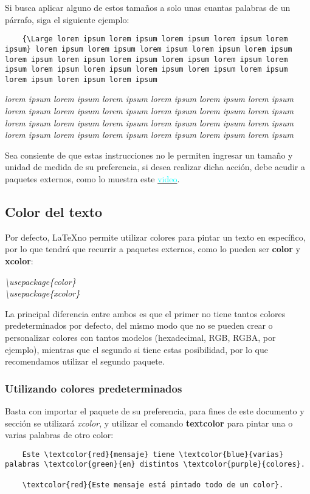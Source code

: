 Si busca aplicar alguno de estos tamaños a solo unas cuantas palabras de un párrafo, siga el siguiente ejemplo:
\begin{lstlisting}
    {\Large lorem ipsum lorem ipsum lorem ipsum lorem ipsum lorem ipsum} lorem ipsum lorem ipsum lorem ipsum lorem ipsum lorem ipsum lorem ipsum lorem ipsum lorem ipsum lorem ipsum lorem ipsum lorem ipsum lorem ipsum lorem ipsum lorem ipsum lorem ipsum lorem ipsum lorem ipsum lorem ipsum lorem ipsum 
\end{lstlisting}

\textit{{\Large lorem ipsum lorem ipsum lorem ipsum lorem ipsum lorem ipsum} lorem ipsum lorem ipsum lorem ipsum lorem ipsum lorem ipsum lorem ipsum lorem ipsum lorem ipsum lorem ipsum lorem ipsum lorem ipsum lorem ipsum lorem ipsum lorem ipsum lorem ipsum lorem ipsum lorem ipsum lorem ipsum lorem ipsum}

Sea consiente de que estas instrucciones no le permiten ingresar un tamaño y unidad de medida de su preferencia, si desea realizar dicha acción, debe acudir a paquetes externos, como lo muestra este \href{https://www.youtube.com/watch?v=VRp4B1JzHTM}{\textcolor{cyan}{video}}.


\subsection{Color del texto}

Por defecto, \LaTeX no permite utilizar colores para pintar un texto en específico, por lo que tendrá que recurrir a paquetes externos, como lo pueden ser \textbf{color} y \textbf{xcolor}:
\begin{center}
    \textit{
        \textbackslash{usepackage\{color\}} \\
        \textbackslash{usepackage\{xcolor\}}
    }
\end{center}

La principal diferencia entre ambos es que el primer no tiene tantos colores predeterminados por defecto, del mismo modo que no se pueden crear o personalizar colores con tantos modelos (hexadecimal, RGB, RGBA, por ejemplo), mientras que el segundo si tiene estas posibilidad, por lo que recomendamos utilizar el segundo paquete.


\subsubsection{Utilizando colores predeterminados}

Basta con importar el paquete de su preferencia, para fines de este documento y sección se utilizará \textit{xcolor}, y utilizar el comando \textbf{textcolor} para pintar una o varias palabras de otro color:
\begin{lstlisting}
    Este \textcolor{red}{mensaje} tiene \textcolor{blue}{varias} palabras \textcolor{green}{en} distintos \textcolor{purple}{colores}.

    \textcolor{red}{Este mensaje está pintado todo de un color}.
\end{lstlisting}


